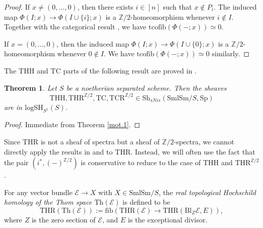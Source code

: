 \documentclass[10pt]{amsart}
\newtheorem{thm}{Theorem}[section]
\theoremstyle{definition}
\theoremstyle{remark}
\numberwithin{equation}{section}
\newcommand{\Z}{\mathbb{Z}}
\newcommand{\cE}{\mathcal{E}}
\newcommand{\fib}{\mathrm{fib}}
\newcommand{\Sh}{\mathrm{Sh}}
\newcommand{\Sp}{\mathrm{Sp}}
\newcommand{\SmlSm}{\mathrm{SmlSm}}
\newcommand{\tcofib}{\mathrm{tcofib}}
\newcommand{\logSH}{\mathrm{logSH}}
\newcommand{\Blow}{\mathrm{Bl}}
\newcommand{\Th}{\mathrm{Th}}
\newcommand{\THH}{\mathrm{THH}}
\newcommand{\THR}{\mathrm{THR}}
\newcommand{\TC}{\mathrm{TC}}
\newcommand{\TCR}{\mathrm{TCR}}
\newcommand{\Ztwo}{{\mathbb{Z}/2}}
\begin{document}
\begin{proof}
If $x\neq (0,\ldots,0)$,
then there exists $i\in [n]$ such that $x\notin P_i$.
The induced map $\Phi(I;x) \to 
 \Phi(I\cup \{i\};x)$
is a $\Ztwo$-homeomorphism whenever $i\notin I$.
Together with the categorical result \cite[Proposition A.6.5]{logSH},
we have $\tcofib(\Phi(-;x))\simeq 0$.

If $x=(0,\ldots,0)$,
then the induced map $\Phi(I;x)\to \Phi(I\cup \{0\};x)$ is a $\Ztwo$-homeomorphism whenever $0\notin I$.
We have $\tcofib(\Phi(-;x))\simeq 0$ similarly.
\end{proof}


The $\THH$ and $\TC$ parts of the following result are proved in \cite[Theorem 8.4.4]{logSH}.

\begin{thm}
\label{mot.3}
Let $S$ be a noetherian separated scheme.
Then the sheaves
\[
\THH,
\THR^{\Z/2},
\TC,
\TCR^{\Z/2}
\in
\Sh_{sNis}(\SmlSm/S,\Sp)
\]
are in $\logSH_{S^1}(S)$.
\end{thm}
\begin{proof}
Immediate from Theorem \ref{mot.1}.
\end{proof}

Since $\THR$ is not a sheaf of spectra but a sheaf of $\Ztwo$-spectra,
we cannot directly apply the results in \cite{logDM} and \cite{logSH} to $\THR$.
Instead, we will often use the fact that the pair $(i^*,(-)^{\Ztwo})$ is conservative to reduce to the case of $\THH$ and $\THR^{\Z/2}$.


For any vector bundle $\cE\to X$ with $X\in \SmlSm/S$,
the \emph{real topological Hochschild homology of the Thom space $\Th(\cE)$} is defined to be
\begin{equation}
\label{mot.15.1}
\THR(\Th(\cE))
:=
\fib(\THR(\cE)
\to
\THR(\Blow_{Z}\cE,E)),
\end{equation}
where $Z$ is the zero section of $\cE$,
and $E$ is the exceptional divisor.
\end{document}
